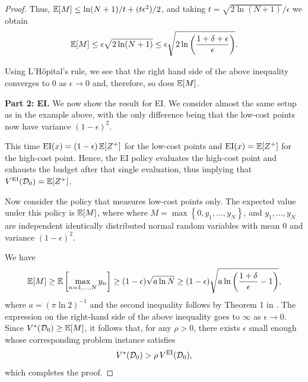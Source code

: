 \begin{proof}
Thus, $\mathbb{E}[M] \leq \ln(N + 1)/t + (t\epsilon^2)/2$, and taking $t=\sqrt{2\ln(N+1)}/\epsilon$ we obtain 
\begin{equation*}
   \mathbb{E}[M]\leq \epsilon\sqrt{2\ln(N+1)} \le \epsilon \sqrt{2\ln\left(\frac{1+\delta + \epsilon}{\epsilon}\right)}.
\end{equation*}

Using L'H\^{o}pital's rule, we see that the right hand side of the above inequality converges to 0 as $\epsilon \to 0$ and, therefore, so does $\mathbb{E}[M]$.


\textbf{Part 2: EI.}
We now show the result for EI. 
We consider almost the same setup as in the example above, with the only difference being that the low-cost points now have variance $(1-\epsilon)^2$.

This time $\mathrm{EI}(x) = (1-\epsilon) \, \mathbb{E}[Z^+]$ for the low-cost points and $\mathrm{EI}(x) = \mathbb{E}[Z^+]$ for the high-cost point. Hence, the EI policy evaluates the high-cost point and exhausts the budget after that single evaluation, thus implying that $V^\mathrm{EI}(\mathcal{D}_0) = \mathbb{E}[Z^+]$.

Now consider the policy that measures low-cost points only. The expected value under this policy is $\mathbb{E}[M]$, where where $M = \max\left\{0, y_1, \ldots, y_N \right\}$, and $y_1,\ldots, y_N$ are independent identically distributed normal random variables with mean $0$ and variance $(1-\epsilon)^2$.

We have
\begin{equation*}
    \mathbb{E}[M] \geq \mathbb{E}\left[\max_{n=1,\ldots, N}y_n\right]
    \geq (1-\epsilon)\sqrt{a\ln N}
     \ge (1-\epsilon) \sqrt{a\ln\left(\frac{1+\delta}{\epsilon}-1\right)},
\end{equation*}
where $a=(\pi\ln 2)^{-1}$ and the second inequality follows by Theorem 1 in  \cite{kamath2015bounds}. The expression on the right-hand side of the above inequality goes to $\infty$ as $\epsilon\to 0$. Since $V^*(\mathcal{D}_0)\geq \mathbb{E}[M]$, it follows that, for any $\rho > 0$, there exists $\epsilon$ small enough whose corresponding problem instance satisfies
\begin{equation*}
V^*(\mathcal{D}_0) > \rho \, V^\mathrm{EI}(\mathcal{D}_0),
\end{equation*}
which completes the proof.
\end{proof}



